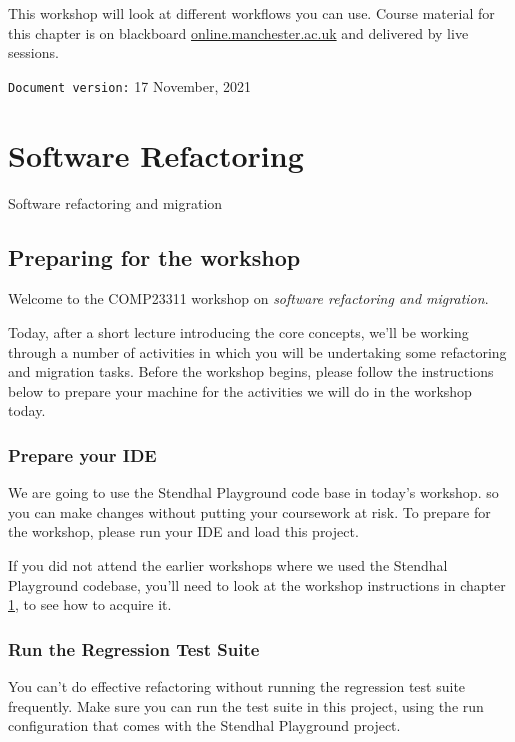 \documentclass[
]{book}
\begin{document}
This workshop will look at different workflows you can use. Course material for this chapter is on blackboard \href{https://online.manchester.ac.uk}{online.manchester.ac.uk} and delivered by live sessions.

\texttt{Document\ version:} 17 November, 2021

\hypertarget{refactoring}{%
\chapter{Software Refactoring}\label{refactoring}}

Software refactoring and migration

\hypertarget{gitprep}{%
\section{Preparing for the workshop}\label{gitprep}}

Welcome to the COMP23311 workshop on \emph{software refactoring and migration}.

Today, after a short lecture introducing the core concepts, we'll be working through a number of activities in which you will be undertaking some refactoring and migration tasks. Before the workshop begins, please follow the instructions below to prepare your machine for the activities we will do in the workshop today.

\hypertarget{prepide}{%
\subsection{Prepare your IDE}\label{prepide}}

We are going to use the Stendhal Playground code base in today's workshop. so you can make changes without putting your coursework at risk. To prepare for the workshop, please run your IDE and load this project.

If you did not attend the earlier workshops where we used the Stendhal Playground codebase, you'll need to look at the workshop instructions in chapter \ref{refactoring}, to see how to acquire it.

\hypertarget{testsuite}{%
\subsection{Run the Regression Test Suite}\label{testsuite}}

You can't do effective refactoring without running the regression test suite frequently. Make sure you can run the test suite in this project, using the run configuration that comes with the Stendhal Playground project.
\end{document}
